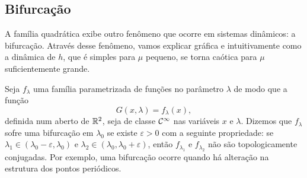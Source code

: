 \subsection{Bifurcação}

A família quadrática exibe outro fenômeno que ocorre em sistemas dinâmicos: a bifurcação.
Através desse fenômeno, vamos explicar gráfica e intuitivamente como a dinâmica de $h$, que é simples para $\mu$ pequeno, se torna caótica para $\mu$ suficientemente grande.

Seja $f_\lambda$ uma família parametrizada de funções no parâmetro $\lambda$ de modo que a função
$$G(x, \lambda) = f_\lambda(x),$$
definida num aberto de $\mathbb{R}^2$, seja de classe $\mathcal{C}^\infty$ nas variáveis $x$ e $\lambda$.
Dizemos que $f_\lambda$ sofre uma bifurcação em $\lambda_0$ se existe $\varepsilon > 0$ com a seguinte propriedade: se $\lambda_1 \in (\lambda_0 - \varepsilon, \lambda_0)$ e $\lambda_2 \in (\lambda_0, \lambda_0 + \varepsilon)$, então $f_{\lambda_1}$ e $f_{\lambda_2}$ não são topologicamente conjugadas.
Por exemplo, uma bifurcação ocorre quando há alteração na estrutura dos pontos periódicos.

